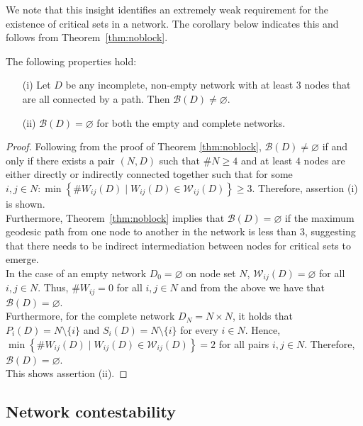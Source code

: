 \bigskip\noindent
We note that this insight identifies an extremely weak requirement for the existence of critical sets in a network. The corollary below indicates this and follows from Theorem~\ref{thm:noblock}.
\begin{corollary}
The following properties hold:
\begin{itemize}
\item[(i)] Let $D$ be any incomplete, non-empty network with at least $3$ nodes that are all connected by a path. Then $\mathcal{B} (D) \neq \varnothing$.

\item[(ii)] $\mathcal{B} (D) = \varnothing$ for both the empty and complete networks.
\end{itemize}
\end{corollary}
\begin{proof}
Following from the proof of Theorem \ref{thm:noblock}, $\mathcal{B}(D) \neq \varnothing$ if and only if there exists a pair $(N,D)$ such that $\# N \geqslant 4$ and at least $4$ nodes are either directly or indirectly connected together such that for some $i,j \in N \colon \min \left\{ \# W_{ij}(D) \mid W_{ij}(D) \in \mathcal{W}_{ij}(D) \right\} \geqslant 3$. Therefore, assertion (i) is shown.
\\[1ex]
Furthermore, Theorem~\ref{thm:noblock} implies that $\mathcal{B} (D) = \varnothing$ if the maximum geodesic path from one node to another in the network is less than $3$, suggesting that there needs to be indirect intermediation between nodes for critical sets to emerge.
\\
In the case of an empty network $D_0 = \varnothing$ on node set $N$, $\mathcal{W}_{ij}(D) = \varnothing$ for all $i,j \in N$. Thus, $\# W_{ij} = 0$ for all $i,j \in N$ and from the above we have that $\mathcal{B} (D) = \varnothing$.
\\
Furthermore, for the complete network $D_N = N \times N$, it holds that $P_{i}(D) = N \setminus \{i\}$ and $S_{i}(D) = N \setminus \{i\}$ for every $i \in N$. Hence, $\min \left\{ \# W_{ij}(D) \mid W_{ij}(D) \in \mathcal{W}_{ij}(D) \right\} = 2$ for all pairs $i,j \in N$. Therefore, $\mathcal{B} (D) = \varnothing$.
\\
This shows assertion (ii).
\end{proof}

\subsection{Network contestability}

